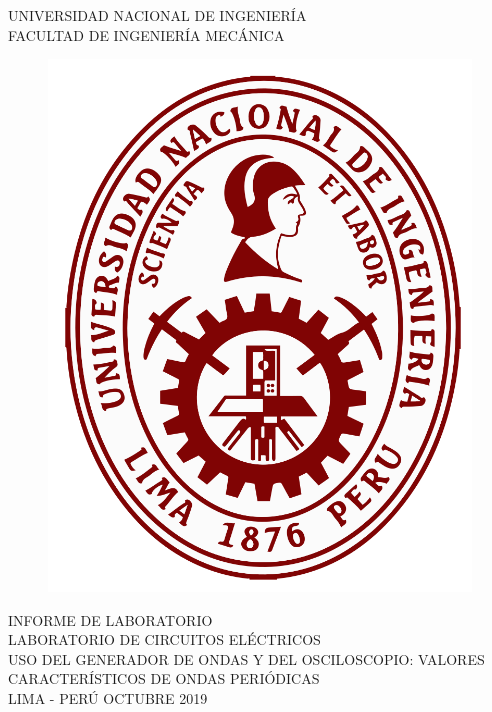 \documentclass[a4paper,12pt]{report}
\begin{document}
\setcounter{page}{1}
\thispagestyle{empty}
\begin{center}
{\huge UNIVERSIDAD NACIONAL DE INGENIERÍA}\\[0.9cm]
{\Large FACULTAD DE INGENIERÍA MECÁNICA}\\[0.6in]
\end{center}
\begin{figure}[h]
\begin{center}
\includegraphics[scale=0.33]{logoUNI.png}
\vspace{0cm}
\end{center}
\end{figure}
\vspace{0.5cm}
\begin{center}
INFORME DE LABORATORIO\\
LABORATORIO DE CIRCUITOS ELÉCTRICOS\\[5mm]
{\large USO DEL GENERADOR DE ONDAS Y DEL OSCILOSCOPIO: VALORES CARACTERÍSTICOS DE ONDAS PERIÓDICAS}\\[10mm]
\vfill
LIMA - PERÚ \hfill OCTUBRE 2019
\end{center}
\end{document}
